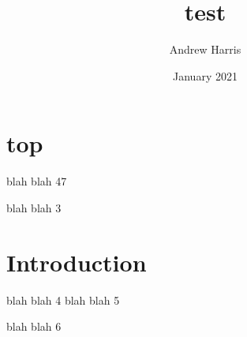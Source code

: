 \documentclass{article}
\title{test}
\author{Andrew Harris}
\date{January 2021}
\begin{document}
\maketitle
\section{top} 
blah blah 47

blah blah 3


\section{Introduction}
blah blah 4
blah blah 5

blah blah 6
\end{document}

